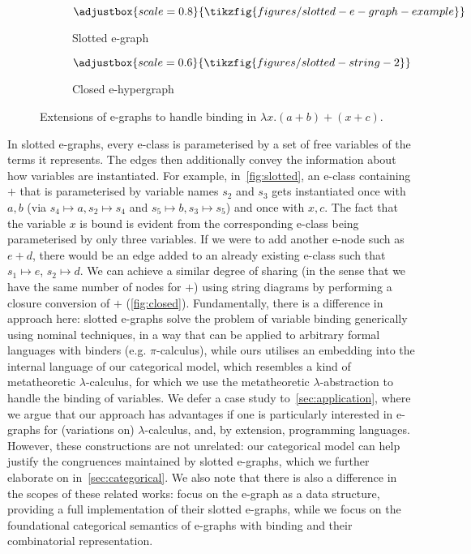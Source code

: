 \begin{figure}[t!]
	\begin{subfigure}[t]{0.45\linewidth}
		\[
			\adjustbox{scale=0.8}{
				\tikzfig{figures/slotted-e-graph-example}
			}
		\]
		\caption{Slotted e-graph}%
		\label{fig:slotted}
	\end{subfigure}
	\hfill
	\begin{subfigure}[t]{0.45\linewidth}
		\[
			\adjustbox{scale=0.6}{
				\tikzfig{figures/slotted-string-2}
			}
		\]
		\caption{Closed e-hypergraph}%
		\label{fig:closed}
	\end{subfigure}
	\caption{Extensions of e-graphs to handle binding in $\lambda x . (a + b) + (x + c)$.}%
	\label{fig:extended-egraphs}
\end{figure}

In slotted e-graphs, every e-class is parameterised by a set of free variables of the terms it represents.
The edges then additionally convey the information about how variables are instantiated.
For example, in~\autoref{fig:slotted}, an e-class containing $+$ that is parameterised by variable names $s_2$ and $s_3$ gets instantiated once with $a,b$ (via $s_4 \mapsto a, s_2 \mapsto s_4$ and $s_5 \mapsto b, s_3 \mapsto s_5$) and once with $x,c$.
The fact that the variable $x$ is bound is evident from the corresponding e-class being parameterised by only three variables.
If we were to add another e-node such as $e + d$, there would be an edge added to an already existing e-class such that $s_1 \mapsto e$, $s_2 \mapsto d$.
We can achieve a similar degree of sharing (in the sense that we have the same number of nodes for $+$) using string diagrams by performing a closure conversion of $+$ (\autoref{fig:closed}).
Fundamentally, there is a difference in approach here: slotted e-graphs solve the problem of variable binding generically using nominal techniques, in a way that can be applied to arbitrary formal languages with binders (e.g. $\pi$-calculus), while ours utilises an embedding into the internal language of our categorical model, which resembles a kind of metatheoretic $\lambda$-calculus, for which we use the metatheoretic $\lambda$-abstraction to handle the binding of variables.
We defer a case study to~\autoref{sec:application}, where we argue that our approach has advantages if one is particularly interested in e-graphs for (variations on) $\lambda$-calculus, and, by extension, programming languages.
However, these constructions are not unrelated: our categorical model can help justify the congruences maintained by slotted e-graphs, which we further elaborate on in~\autoref{sec:categorical}.
We also note that there is also a difference in the scopes of these related works: \citet{slotted-egraphs} focus on the e-graph as a data structure, providing a full implementation of their slotted e-graphs, while we focus on the foundational categorical semantics of e-graphs with binding and their combinatorial representation.


